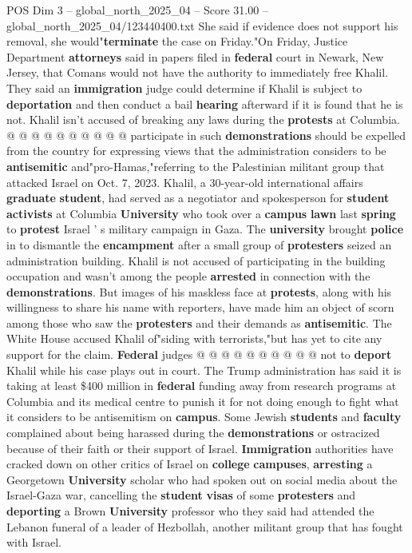 \begin{textsample}{POS Dim 3 – global\_north\_2025\_04 – Score 31.00 – global\_north\_2025\_04/123440400.txt}
She said if evidence does not support his removal, she would"\textbf{terminate} the case on Friday."On Friday, Justice Department \textbf{attorneys} said in papers filed in \textbf{federal} court in Newark, New Jersey, that Comans would not have the authority to immediately free Khalil.
They said an \textbf{immigration} judge could determine if Khalil is subject to \textbf{deportation} and then conduct a bail \textbf{hearing} afterward if it is found that he is not.
Khalil isn't accused of breaking any laws during the \textbf{protests} at Columbia. @ @ @ @ @ @ @ @ @ @ participate in such \textbf{demonstrations} should be expelled from the country for expressing views that the administration considers to be \textbf{antisemitic} and"pro-Hamas,"referring to the Palestinian militant group that attacked Israel on Oct. 7, 2023.
Khalil, a 30-year-old international affairs \textbf{graduate} \textbf{student}, had served as a negotiator and spokesperson for \textbf{student} \textbf{activists} at Columbia \textbf{University} who took over a \textbf{campus} \textbf{lawn} last \textbf{spring} to \textbf{protest} Israel ' s military campaign in Gaza.
The \textbf{university} brought \textbf{police} in to dismantle the \textbf{encampment} after a small group of \textbf{protesters} seized an administration building.
Khalil is not accused of participating in the building occupation and wasn't among the people \textbf{arrested} in connection with the \textbf{demonstrations}.
But images of his maskless face at \textbf{protests}, along with his willingness to share his name with reporters, have made him an object of scorn among those who saw the \textbf{protesters} and their demands as \textbf{antisemitic}.
The White House accused Khalil of"siding with terrorists,"but has yet to cite any support for the claim. \textbf{Federal} judges @ @ @ @ @ @ @ @ @ @ not to \textbf{deport} Khalil while his case plays out in court.
The Trump administration has said it is taking at least \$400 million in \textbf{federal} funding away from research programs at Columbia and its medical centre to punish it for not doing enough to fight what it considers to be antisemitism on \textbf{campus}.
Some Jewish \textbf{students} and \textbf{faculty} complained about being harassed during the \textbf{demonstrations} or ostracized because of their faith or their support of Israel. \textbf{Immigration} authorities have cracked down on other critics of Israel on \textbf{college} \textbf{campuses}, \textbf{arresting} a Georgetown \textbf{University} scholar who had spoken out on social media about the Israel-Gaza war, cancelling the \textbf{student} \textbf{visas} of some \textbf{protesters} and \textbf{deporting} a Brown \textbf{University} professor who they said had attended the Lebanon funeral of a leader of Hezbollah, another militant group that has fought with Israel.


\end{textsample}
